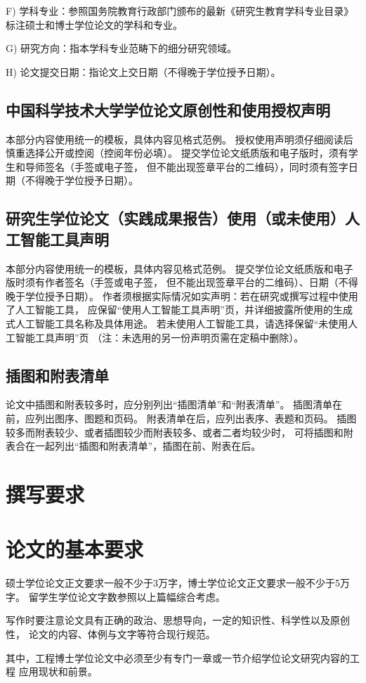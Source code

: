F) 学科专业：参照国务院教育行政部门颁布的最新《研究生教育学科专业目录》
标注硕士和博士学位论文的学科和专业。

G) 研究方向：指本学科专业范畴下的细分研究领域。

H) 论文提交日期：指论文上交日期（不得晚于学位授予日期）。



\subsection{中国科学技术大学学位论文原创性和使用授权声明}

本部分内容使用统一的模板，具体内容见格式范例。
授权使用声明须仔细阅读后慎重选择公开或控阅（控阅年份必填）。
提交学位论文纸质版和电子版时，须有学生和导师签名（手签或电子签，
但不能出现签章平台的二维码），同时须有签字日期（不得晚于学位授予日期）。


\subsection{研究生学位论文（实践成果报告）使用（或未使用）人工智能工具声明}

本部分内容使用统一的模板，具体内容见格式范例。
提交学位论文纸质版和电子版时须有作者签名（手签或电子签，
但不能出现签章平台的二维码）、日期（不得晚于学位授予日期）。
作者须根据实际情况如实声明：若在研究或撰写过程中使用了人工智能工具，
应保留“使用人工智能工具声明”页，并详细披露所使用的生成式人工智能工具名称及具体用途。
若未使用人工智能工具，请选择保留“未使用人工智能工具声明”页
（注：未选用的另一份声明页需在定稿中删除）。


\subsection{插图和附表清单}

论文中插图和附表较多时，应分别列出“插图清单”和“附表清单”。
插图清单在前，应列出图序、图题和页码。
附表清单在后，应列出表序、表题和页码。
插图较多而附表较少、或者插图较少而附表较多、或者二者均较少时，
可将插图和附表合在一起列出“插图和附表清单”，插图在前、附表在后。


\section{撰写要求}

\section{论文的基本要求}

硕士学位论文正文要求一般不少于3万字，博士学位论文正文要求一般不少于5万字。
留学生学位论文字数参照以上篇幅综合考虑。

写作时要注意论文具有正确的政治、思想导向，一定的知识性、科学性以及原创性，
论文的内容、体例与文字等符合现行规范。

其中，工程博士学位论文中必须至少有专门一章或一节介绍学位论文研究内容的工程
应用现状和前景。
